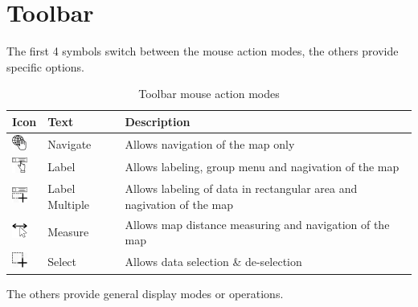 \section{Toolbar}

The first 4 symbols switch between the mouse action modes, the others provide specific options.

\begin{table}[H]
  \center
  \begin{tabular}{ | l | l | l |}
    \hline
    \textbf{Icon} & \textbf{Text} &  \textbf{Description} \\ \hline
    \includegraphics[width=0.5cm,frame]{../../data/icons/navigate.png} & Navigate & Allows navigation of the map only \\ \hline
    \includegraphics[width=0.5cm,frame]{../../data/icons/label_action.png} & Label & Allows labeling, group menu and nagivation of the map \\ \hline
    \includegraphics[width=0.5cm,frame]{../../data/icons/label_multiple_action.png} & Label Multiple & Allows labeling of data in rectangular area and nagivation of the map \\ \hline
    \includegraphics[width=0.5cm,frame]{../../data/icons/measure_action.png} & Measure & Allows map distance measuring and navigation of the map \\ \hline
    \includegraphics[width=0.5cm,frame]{../../data/icons/select_action.png} & Select & Allows data selection \& de-selection \\ \hline
  \end{tabular}
  \caption{Toolbar mouse action modes}
\end{table}

The others provide general display modes or operations.

